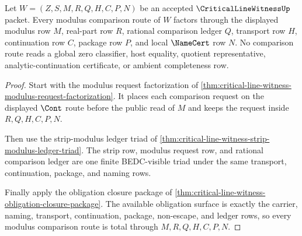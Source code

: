 \begin{theorem}
\label{thm:critical-line-witness-modulus-comparison-route-totality}
Let $W=(Z,S,M,R,Q,H,C,P,N)$ be an accepted $\CriticalLineWitnessUp$ packet. Every modulus comparison route of $W$ factors through the displayed modulus row $M$, real-part row $R$, rational comparison ledger $Q$, transport row $H$, continuation row $C$, package row $P$, and local $\NameCert$ row $N$. No comparison route reads a global zero classifier, host equality, quotient representative, analytic-continuation certificate, or ambient completeness row.
\end{theorem}
\begin{proof}
Start with the modulus request factorization of \autoref{thm:critical-line-witness-modulus-request-factorization}. It places each comparison request on the displayed $\Cont$ route before the public read of $M$ and keeps the request inside $R,Q,H,C,P,N$.

Then use the strip-modulus ledger triad of \autoref{thm:critical-line-witness-strip-modulus-ledger-triad}. The strip row, modulus request row, and rational comparison ledger are one finite BEDC-visible triad under the same transport, continuation, package, and naming rows.

Finally apply the obligation closure package of \autoref{thm:critical-line-witness-obligation-closure-package}. The available obligation surface is exactly the carrier, naming, transport, continuation, package, non-escape, and ledger rows, so every modulus comparison route is total through $M,R,Q,H,C,P,N$.
\end{proof}

